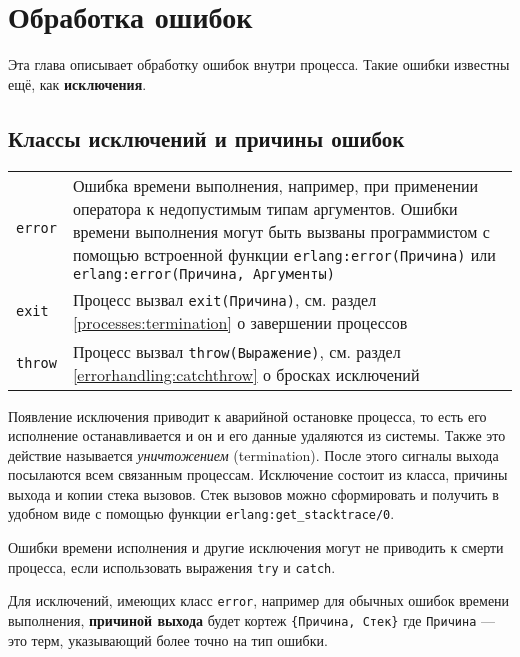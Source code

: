 \chapter{Обработка ошибок}
\label{errorhandling}

Эта глава описывает обработку ошибок внутри процесса. Такие ошибки известны ещё, 
как \textbf{исключения}.


\section{Классы исключений и причины ошибок}

\begin{center}
\begin{tabular}{|>{\raggedright}p{55pt}|>{\raggedright}p{350pt}|}
\hline
\multicolumn{2}{|p{326pt}|}{Классы исключений}\tabularnewline
\hline
\texttt{error} &
Ошибка времени выполнения, например, при применении оператора к недопустимым типам
аргументов. Ошибки времени выполнения могут быть вызваны программистом с помощью
встроенной функции \texttt{erlang:error(Причина)} или 
\texttt{erlang:error(Причина, Аргументы)} \tabularnewline
\hline
\texttt{exit}  &
Процесс вызвал \texttt{exit(Причина)}, см. раздел \ref{processes:termination}
о завершении процессов \tabularnewline
\hline
\texttt{throw}  & 
Процесс вызвал \texttt{throw(Выражение)}, см. раздел 
\ref{errorhandling:catchthrow} о бросках исключений\tabularnewline
\hline
\end{tabular}
\end{center}

Появление исключения приводит к аварийной остановке процесса, то есть его 
исполнение останавливается и он и его данные удаляются из системы. Также это 
действие называется \emph{уничтожением} (termination). После этого сигналы выхода
посылаются всем связанным процессам. Исключение состоит из класса, причины выхода
и копии стека вызовов. Стек вызовов можно сформировать и получить в удобном виде с 
помощью функции \texttt{erlang:get\_stacktrace/0}.

Ошибки времени исполнения и другие исключения могут не приводить к смерти 
процесса, если использовать выражения \texttt{try} и \texttt{catch}.

Для исключений, имеющих класс \texttt{error}, например для обычных ошибок времени 
выполнения, \textbf{причиной выхода} будет кортеж \texttt{\{Причина, Стек\}} где
\texttt{Причина} --- это терм, указывающий более точно на тип ошибки.

